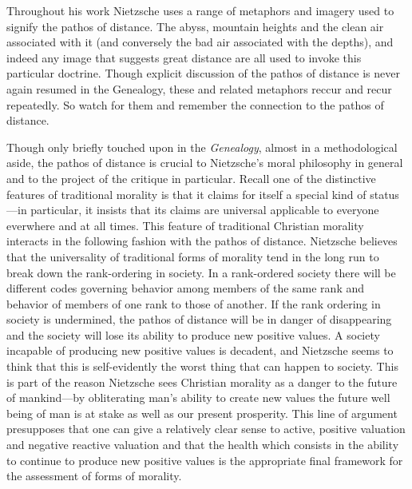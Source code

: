Throughout his work Nietzsche uses a range of metaphors and imagery used to signify the pathos of distance. The abyss, mountain heights and the clean air associated with it (and conversely the bad air associated with the depths), and indeed any image that suggests great distance are all used to invoke this particular doctrine. Though explicit discussion of the pathos of distance is never again resumed in the Genealogy, these and related metaphors reccur and recur repeatedly. So watch for them and remember the connection to the pathos of distance.

Though only briefly touched upon in the \emph{Genealogy}, almost in a methodological aside, the pathos of distance is crucial to Nietzsche's moral philosophy in general and to the project of the critique in particular. Recall one of the distinctive features of traditional morality is that it claims for itself a special kind of status---in particular, it insists that its claims are universal applicable to everyone everwhere and at all times. This feature of traditional Christian morality interacts in the following fashion with the pathos of distance. Nietzsche believes that the universality of traditional forms of morality tend in the long run to break down the rank-ordering in society. In a rank-ordered society there will be different codes governing behavior among members of the same rank and behavior of members of one rank to those of another. If the rank ordering in society is undermined, the pathos of distance will be in danger of disappearing and the society will lose its ability to produce new positive values. A society incapable of producing new positive values is decadent, and Nietzsche seems to think that this is self-evidently the worst thing that can happen to society. This is part of the reason Nietzsche sees Christian morality as a danger to the future of mankind---by obliterating man's ability to create new values the future well being of man is at stake as well as our present prosperity. This line of argument presupposes that one can give a relatively clear sense to active, positive valuation and negative reactive valuation and that the health which consists in the ability to continue to produce new positive values is the appropriate final framework for the assessment of forms of morality. \change

